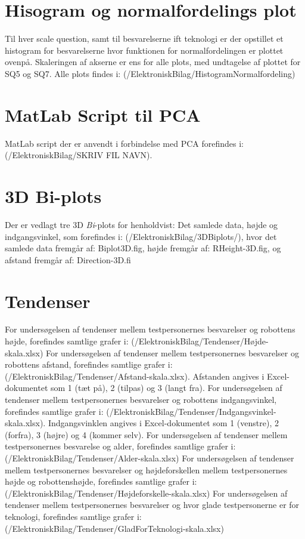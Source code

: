 \section{Hisogram og normalfordelings plot}
\label{ElektroniskBilagHistNormal}
%
Til hver scale question, samt til besvarelserne ift teknologi er der opstillet et histogram for besvarelserne hvor funktionen for normalfordelingen er plottet ovenpå.  
Skaleringen af akserne er ens for alle plots, med undtagelse af plottet for SQ5 og SQ7. Alle plots findes i: (/ElektroniskBilag/HistogramNormalfordeling)

\section{MatLab Script til PCA}
\label{ElektroniskBilagMatLabPCA}
%
MatLab script der er anvendt i forbindelse med PCA forefindes i: (/ElektroniskBilag/SKRIV FIL NAVN).


\section{3D Bi-plots}
\label{ElektroniskBilag3D}
%
Der er vedlagt tre 3D \textit{Bi}-plots for henholdvist: Det samlede data, højde og indgangsvinkel, som forefindes i: (/ElektroniskBilag/3DBiplots/), hvor det samlede data fremgår af: Biplot3D.fig, højde fremgår af: RHeight-3D.fig, og afstand fremgår af: Direction-3D.fi

\section{Tendenser}
\label{ElektroniskBilagTendenser}
%
For undersøgelsen af tendenser mellem testpersonernes besvarelser og robottens højde, forefindes samtlige grafer i: (/ElektroniskBilag/Tendenser/Højde-skala.xlsx)\blankline
%
For undersøgelsen af tendenser mellem testpersonernes besvarelser og robottens afstand, forefindes samtlige grafer i: (/ElektroniskBilag/Tendenser/Afstand-skala.xlsx). Afstanden angives i Excel-dokumentet som 1 (tæt på), 2 (tilpas) og 3 (langt fra).\blankline
%
For undersøgelsen af tendenser mellem testpersonernes besvarelser og robottens indgangsvinkel, forefindes samtlige grafer i: (/ElektroniskBilag/Tendenser/Indgangsvinkel-skala.xlsx). Indgangsvinklen angives i Excel-dokumentet som 1 (venstre), 2 (forfra), 3 (højre) og 4 (kommer selv).\blankline
%
For undersøgelsen af tendenser mellem testpersonernes besvarelse og alder, forefindes samtlige grafer i: (/ElektroniskBilag/Tendenser/Alder-skala.xlsx)\blankline
%
For undersøgelsen af tendenser mellem testpersonernes besvarelser og højdeforskellen mellem testpersonernes højde og robottenshøjde, forefindes samtlige grafer i: \\
(/ElektroniskBilag/Tendenser/Højdeforskelle-skala.xlsx)\blankline
%
For undersøgelsen af tendenser mellem testpersonernes besvarelser og hvor glade testpersonerne er for teknologi, forefindes samtlige grafer i:\\
(/ElektroniskBilag/Tendenser/GladForTeknologi-skala.xlsx)

